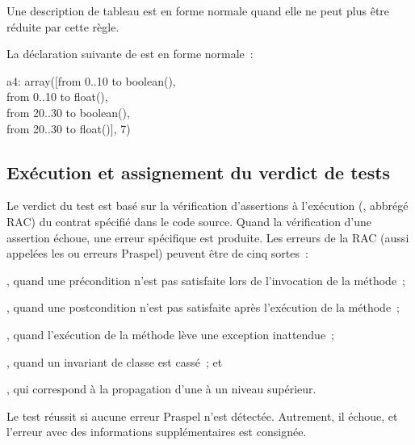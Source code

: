 Une description de tableau est en forme normale quand elle ne peut plus être
réduite par cette règle.

\begin{example}

La déclaration suivante de  est en forme normale~:

\begin{pre}
a4: array([from  0..10 to boolean(), \\
           from  0..10 to float(), \\
           from 20..30 to boolean(), \\
           from 20..30 to float()], 7)
\end{pre}

\end{example}

\subsection{Exécution et assignement du verdict de tests}
\label{subsection:language:verdict}

Le verdict du test est basé sur la vérification d'assertions à l'exécution
(, abbrégé RAC) du contrat spécifié dans
le code source. Quand la vérification d'une assertion échoue, une erreur
spécifique est produite. Les erreurs de la RAC (aussi appelées les
 ou erreurs Praspel) peuvent être de cinq sortes~:
%
\begin{inparaenum}[$(i)$]
%
\item {}, quand une précondition n'est pas
satisfaite lors de l'invocation de la méthode~;
%
\item {}, quand une postcondition n'est pas
satisfaite après l'exécution de la méthode~;
%
\item {}, quand l'exécution de la méthode lève une
exception inattendue~;
%
\item {}, quand un invariant de classe est cassé~; et
%
\item {}, qui correspond à la propagation
d'une  à un niveau supérieur.
%
\end{inparaenum}

Le test réussit si aucune erreur Praspel n'est détectée. Autrement, il échoue,
et l'erreur avec des informations supplémentaires est consignée.
